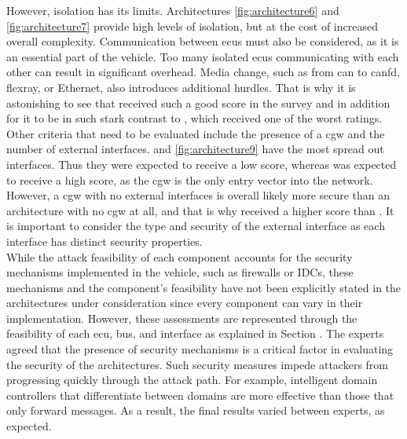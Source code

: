 However, isolation has its limits.
Architectures \ref{fig:architecture6} and \ref{fig:architecture7} provide high levels of isolation, but at the cost of increased overall complexity.
Communication between \acrshort{ecu}s must also be considered, as it is an essential part of the vehicle. 
Too many isolated \acrshort{ecu}s communicating with each other can result in significant overhead. 
Media change, such as from \acrshort{can} to \acrshort{canfd}, \acrshort{flexray}, or Ethernet, also introduces additional hurdles.
That is why it is astonishing to see that  received such a good score in the survey
and in addition for it to be in such stark contrast to , which received one of the worst ratings.\\

Other criteria that need to be evaluated include the presence of a \acrshort{cgw} and the number of external interfaces. 
 and \ref{fig:architecture9} have the most spread out interfaces. 
Thus they were expected to receive a low score, whereas  was expected to receive a high score, as the \acrshort{cgw} is the only entry vector into the network.
However, a \acrshort{cgw} with no external interfaces is overall likely more secure than an architecture with no \acrshort{cgw} at all, and that is why 
 received a higher score than . 
It is important to consider the type and security of the external interface as each interface has distinct security properties.\\

While the attack feasibility of each component accounts for the security mechanisms implemented in the vehicle, such as firewalls or IDCs, 
these mechanisms and the component's feasibility have not been explicitly stated in the architectures under consideration since every component can vary in their implementation.
However, these assessments are represented through the feasibility of each \acrshort{ecu}, bus, and interface as explained in Section .
The experts agreed that the presence of security mechanisms is a critical factor in evaluating the security of the architectures.
Such security measures impede attackers from progressing quickly through the attack path. 
For example, intelligent domain controllers that differentiate between domains are more effective than those that only forward messages.
As a result, the final results varied between experts, as expected.\\

